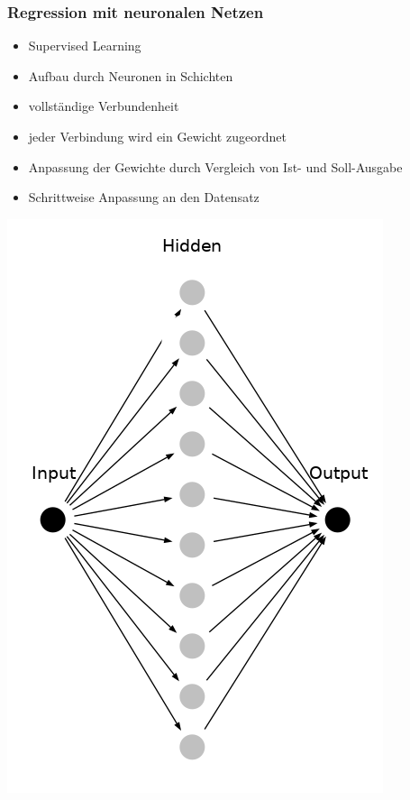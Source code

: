 
\begin{frame}
\frametitle{Regression mit neuronalen Netzen}

\begin{minipage}[t]{0.6\textwidth}\vspace{0pt}
	\begin{itemize}
		\item Supervised Learning
		\item Aufbau durch Neuronen in Schichten
		\item vollständige Verbundenheit
		\item jeder Verbindung wird ein Gewicht zugeordnet
		\item Anpassung der Gewichte durch Vergleich von Ist- und Soll-Ausgabe
		\item Schrittweise Anpassung an den Datensatz
	\end{itemize}
\end{minipage}%
\begin{minipage}[t]{0.4\textwidth}\vspace{0pt}
	\hspace{0.1\linewidth}\includegraphics[width=0.9\linewidth]{fig7/nnsample.png}
\end{minipage}%

\end{frame}

